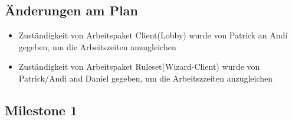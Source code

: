 \documentclass{article}
\begin{document}
\subsection{Änderungen am Plan}
\begin{itemize}
\item Zuständigkeit von Arbeitspaket Client(Lobby) wurde von Patrick an Andi gegeben, um die Arbeitszeiten anzugleichen
\item Zuständigkeit von Arbeitspaket Ruleset(Wizard-Client) wurde von Patrick/Andi and Daniel gegeben, um die Arbeitszzeiten anzugleichen
\end{itemize}

\subsection{Milestone 1}
\end{document}
